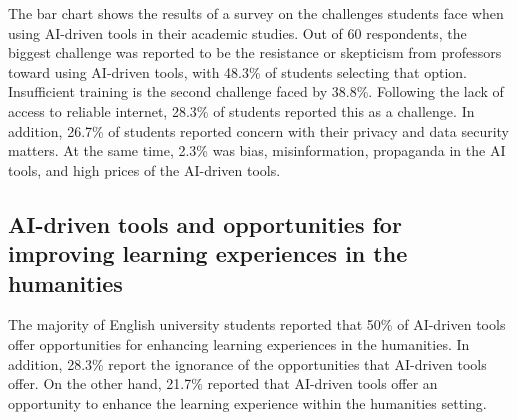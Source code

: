 \begin{figure}[H]
	\centering
\end{figure}
The bar chart shows the results of a survey on the challenges students face when using AI-driven tools in their academic studies.
Out of 60 respondents, the biggest challenge was reported to be the resistance or skepticism from professors toward using AI-driven
tools, with 48.3\% of students selecting that option. Insufficient training is the second challenge faced by 38.8\%.
Following the lack of access to reliable internet, 28.3\% of students reported this as a challenge.
In addition, 26.7\% of students reported concern with their privacy and data security matters. At the same time,
2.3\% was bias, misinformation, propaganda in the AI tools, and high prices of the AI-driven tools.
\subsection{AI-driven tools and opportunities for improving learning experiences in the humanities }

\begin{figure}[h]
	\centering
\end{figure}
The majority of English university students reported that 50\% of AI-driven tools offer opportunities for enhancing learning experiences in the humanities.
In addition, 28.3\% report the ignorance of the opportunities that AI-driven tools offer.
On the other hand, 21.7\% reported that AI-driven tools offer an opportunity to enhance the learning experience within the humanities setting.

